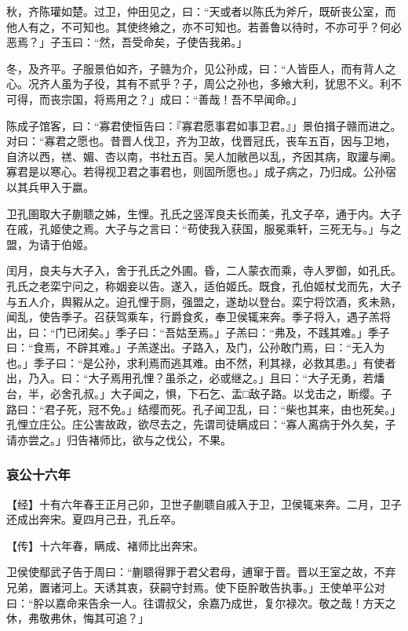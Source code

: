 \documentclass[]{article}
\begin{document}
秋，齐陈瓘如楚。过卫，仲田见之，曰：``天或者以陈氏为斧斤，既斫丧公室，而他人有之，不可知也。其使终飨之，亦不可知也。若善鲁以待时，不亦可乎？何必恶焉？」子玉曰：``然，吾受命矣，子使告我弟。」

冬，及齐平。子服景伯如齐，子赣为介，见公孙成，曰：``人皆臣人，而有背人之心。况齐人虽为子役，其有不贰乎？子，周公之孙也，多飨大利，犹思不义。利不可得，而丧宗国，将焉用之？」成曰：``善哉！吾不早闻命。」

陈成子馆客，曰：``寡君使恒告曰：『寡君愿事君如事卫君。』」景伯揖子赣而进之。对曰：``寡君之愿也。昔晋人伐卫，齐为卫故，伐晋冠氏，丧车五百，因与卫地，自济以西，禚、媚、杏以南，书社五百。吴人加敝邑以乱，齐因其病，取讙与阐。寡君是以寒心。若得视卫君之事君也，则固所愿也。」成子病之，乃归成。公孙宿以其兵甲入于嬴。

卫孔圉取大子蒯聩之姊，生悝。孔氏之竖浑良夫长而美，孔文子卒，通于内。大子在戚，孔姬使之焉。大子与之言曰：``苟使我入获国，服冕乘轩，三死无与。」与之盟，为请于伯姬。

闰月，良夫与大子入，舍于孔氏之外圃。昏，二人蒙衣而乘，寺人罗御，如孔氏。孔氏之老栾宁问之，称姻妾以告。遂入，适伯姬氏。既食，孔伯姬杖戈而先，大子与五人介，舆豭从之。迫孔悝于厕，强盟之，遂劫以登台。栾宁将饮酒，炙未熟，闻乱，使告季子。召获驾乘车，行爵食炙，奉卫侯辄来奔。季子将入，遇子羔将出，曰：``门已闭矣。」季子曰：``吾姑至焉。」子羔曰：``弗及，不践其难。」季子曰：``食焉，不辟其难。」子羔遂出。子路入，及门，公孙敢门焉，曰：``无入为也。」季子曰：``是公孙，求利焉而逃其难。由不然，利其禄，必救其患。」有使者出，乃入。曰：``大子焉用孔悝？虽杀之，必或继之。」且曰：``大子无勇，若燔台，半，必舍孔叔。」大子闻之，惧，下石乞、盂□敌子路。以戈击之，断缨。子路曰：``君子死，冠不免。」结缨而死。孔子闻卫乱，曰：``柴也其来，由也死矣。」孔悝立庄公。庄公害故政，欲尽去之，先谓司徒瞒成曰：``寡人离病于外久矣，子请亦尝之。」归告褚师比，欲与之伐公，不果。

\hypertarget{header-n3215}{%
\subsubsection{哀公十六年}\label{header-n3215}}

【经】十有六年春王正月己卯，卫世子蒯聩自戚入于卫，卫侯辄来奔。二月，卫子还成出奔宋。夏四月己丑，孔丘卒。

【传】十六年春，瞒成、褚师比出奔宋。

卫侯使鄢武子告于周曰：``蒯聩得罪于君父君母，逋窜于晋。晋以王室之故，不弃兄弟，置诸河上。天诱其衷，获嗣守封焉。使下臣肸敢告执事。」王使单平公对曰：``肸以嘉命来告余一人。往谓叔父，余嘉乃成世，复尔禄次。敬之哉！方天之休，弗敬弗休，悔其可追？」
\end{document}
